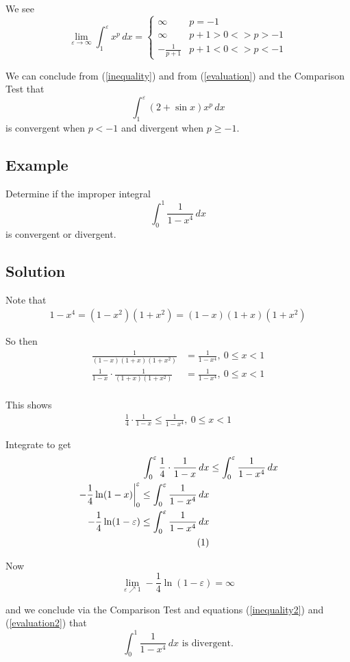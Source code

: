\documentclass[11pt]{article}
\newcommand\numberthis{\addtocounter{equation}{1}\tag{\theequation}}
\begin{document}
We see
\begin{equation} \label{evaluation}
\lim_{\varepsilon \rightarrow \infty} \int_1^\varepsilon x^p \, dx = \begin{cases}
	\infty & p =-1 \\
	\infty & p + 1 > 0 <> p > -1 \\
	- \frac{1}{p+1} & p + 1 < 0 <> p < -1
\end{cases}
\end{equation}

We can conclude from (\ref{inequality}) and from (\ref{evaluation}) and the Comparison Test that 
\[ \int_1^\varepsilon (2+ \sin x) x^p \, dx \]
is convergent when $p < - 1$ and divergent when $p \geq -1$.

\subsection*{Example}
Determine if the improper integral
\[ \int_0^1 \frac{1}{1-x^4} \, dx \]
is convergent or divergent.

\subsection*{Solution}
Note that
\begin{align*}
1 - x^4 = (1-x^2)(1+x^2) = (1-x)(1+x)(1+x^2)
\end{align*}

So then
\begin{align*}
\frac{1}{(1-x)(1+x)(1+x^2)} &= \frac{1}{1-x^4} ,\ 0 \leq x < 1 \\
\frac{1}{1-x} \cdot \frac{1}{(1+x)(1+x^2)} &= \frac{1}{1-x^4} ,\ 0 \leq x < 1 \\
\end{align*}

This shows
\begin{align*}
\frac{1}{4} \cdot \frac{1}{1-x} \leq \frac{1}{1-x^4} ,\ 0 \leq x < 1
\end{align*}

Integrate to get
\begin{align*}
\int_0^\varepsilon \frac{1}{4} \cdot \frac{1}{1-x} \,dx &\leq \int_0^\varepsilon \frac{1}{1-x^4} \,dx \\
\left. -\frac{1}{4} \ln(1-x) \right|_0^\varepsilon \leq \int_0^\varepsilon \frac{1}{1-x^4} \,dx \\
-\frac{1}{4} \ln(1-\varepsilon) \leq \int_0^\varepsilon \frac{1}{1-x^4} \,dx \\ \numberthis \label{evaluation2}
\end{align*}

Now
\begin{equation} \label{inequality2}
\lim_{\varepsilon\nearrow 1} -\frac{1}{4} \ln(1-\varepsilon) = \infty
\end{equation}

and we conclude via the Comparison Test and equations (\ref{inequality2}) and (\ref{evaluation2}) that
\[ \int_0^1 \frac{1}{1-x^4} \, dx \text{ is divergent.} \]
\end{document}
